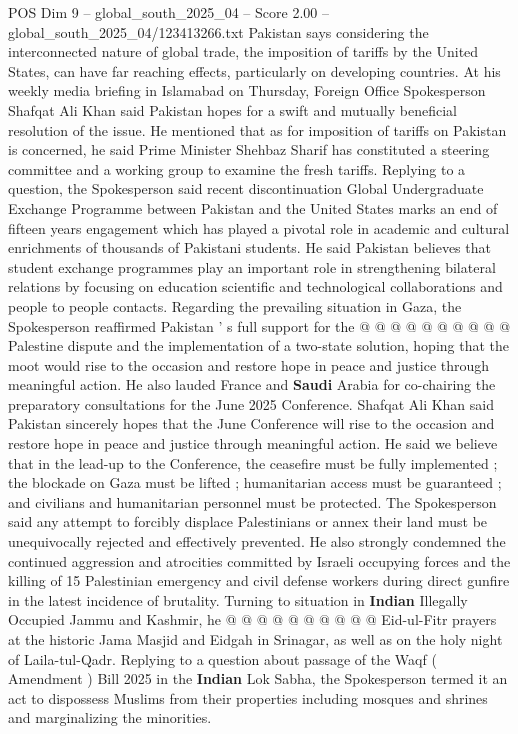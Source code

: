 \begin{textsample}{POS Dim 9 – global\_south\_2025\_04 – Score 2.00 – global\_south\_2025\_04/123413266.txt}  \label{ex:f9_pos_145}
Pakistan says considering the interconnected nature of global trade, the imposition of tariffs by the United States, can have far reaching effects, particularly on developing countries.
At his weekly media briefing in Islamabad on Thursday, Foreign Office Spokesperson Shafqat Ali Khan said Pakistan hopes for a swift and mutually beneficial resolution of the issue.
He mentioned that as for imposition of tariffs on Pakistan is concerned, he said Prime Minister Shehbaz Sharif has constituted a steering committee and a working group to examine the fresh tariffs.
Replying to a question, the Spokesperson said recent discontinuation Global Undergraduate Exchange Programme between Pakistan and the United States marks an end of fifteen years engagement which has played a pivotal role in academic and cultural enrichments of thousands of Pakistani students.
He said Pakistan believes that student exchange programmes play an important role in strengthening bilateral relations by focusing on education scientific and technological collaborations and people to people contacts.
Regarding the prevailing situation in Gaza, the Spokesperson reaffirmed Pakistan ' s full support for the @ @ @ @ @ @ @ @ @ @ Palestine dispute and the implementation of a two-state solution, hoping that the moot would rise to the occasion and restore hope in peace and justice through meaningful action.
He also lauded France and \textbf{Saudi} Arabia for co-chairing the preparatory consultations for the June 2025 Conference.
Shafqat Ali Khan said Pakistan sincerely hopes that the June Conference will rise to the occasion and restore hope in peace and justice through meaningful action.
He said we believe that in the lead-up to the Conference, the ceasefire must be fully implemented ; the blockade on Gaza must be lifted ; humanitarian access must be guaranteed ; and civilians and humanitarian personnel must be protected.
The Spokesperson said any attempt to forcibly displace Palestinians or annex their land must be unequivocally rejected and effectively prevented.
He also strongly condemned the continued aggression and atrocities committed by Israeli occupying forces and the killing of 15 Palestinian emergency and civil defense workers during direct gunfire in the latest incidence of brutality.
Turning to situation in \textbf{Indian} Illegally Occupied Jammu and Kashmir, he @ @ @ @ @ @ @ @ @ @ Eid-ul-Fitr prayers at the historic Jama Masjid and Eidgah in Srinagar, as well as on the holy night of Laila-tul-Qadr.
Replying to a question about passage of the Waqf ( Amendment ) Bill 2025 in the \textbf{Indian} Lok Sabha, the Spokesperson termed it an act to dispossess Muslims from their properties including mosques and shrines and marginalizing the minorities.

\end{textsample}
